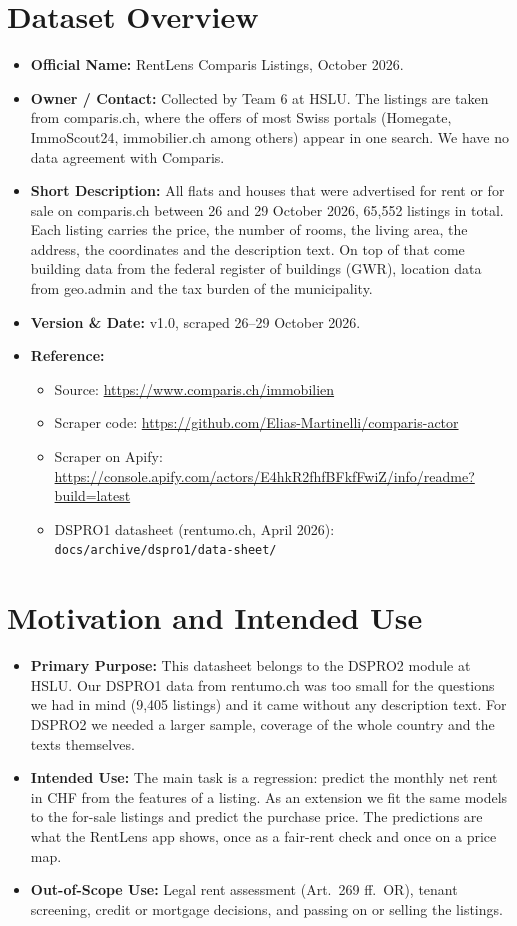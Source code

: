 \documentclass[11pt, a4paper]{article}
\begin{document}
\section{Dataset Overview}
\begin{itemize}
    \item \textbf{Official Name:} RentLens Comparis Listings, October 2026.
    \item \textbf{Owner / Contact:} Collected by Team 6 at HSLU. The listings are taken from comparis.ch, where the offers of most Swiss portals (Homegate, ImmoScout24, immobilier.ch among others) appear in one search. We have no data agreement with Comparis.
    \item \textbf{Short Description:} All flats and houses that were advertised for rent or for sale on comparis.ch between 26 and 29 October 2026, 65{,}552 listings in total. Each listing carries the price, the number of rooms, the living area, the address, the coordinates and the description text. On top of that come building data from the federal register of buildings (GWR), location data from geo.admin and the tax burden of the municipality.
    \item \textbf{Version \& Date:} v1.0, scraped 26--29 October 2026.
    \item \textbf{Reference:}
    \begin{itemize}
        \item Source: \url{https://www.comparis.ch/immobilien}
        \item Scraper code: \url{https://github.com/Elias-Martinelli/comparis-actor}
        \item Scraper on Apify: \url{https://console.apify.com/actors/E4hkR2fhfBFkfFwiZ/info/readme?build=latest}
        \item DSPRO1 datasheet (rentumo.ch, April 2026): \texttt{docs/archive/dspro1/data-sheet/}
    \end{itemize}
\end{itemize}

\section{Motivation and Intended Use}
\begin{itemize}
    \item \textbf{Primary Purpose:} This datasheet belongs to the DSPRO2 module at HSLU. Our DSPRO1 data from rentumo.ch was too small for the questions we had in mind (9{,}405 listings) and it came without any description text. For DSPRO2 we needed a larger sample, coverage of the whole country and the texts themselves.
    \item \textbf{Intended Use:} The main task is a regression: predict the monthly net rent in CHF from the features of a listing. As an extension we fit the same models to the for-sale listings and predict the purchase price. The predictions are what the RentLens app shows, once as a fair-rent check and once on a price map.
    \item \textbf{Out-of-Scope Use:} Legal rent assessment (Art.\ 269 ff.\ OR), tenant screening, credit or mortgage decisions, and passing on or selling the listings.
\end{itemize}
\end{document}
